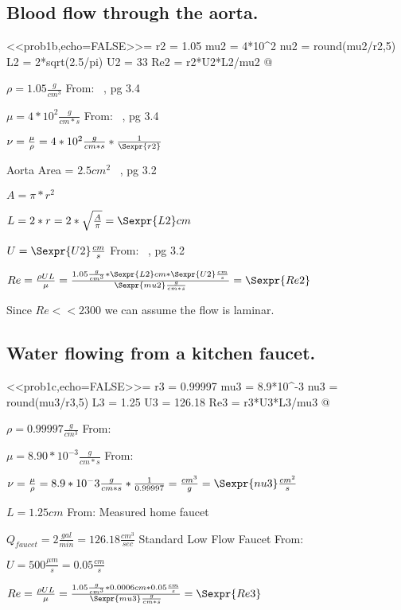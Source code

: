 \documentclass{article}
\begin{document}
\subsection{Blood flow through the aorta.}

<<prob1b,echo=FALSE>>=
r2 = 1.05
mu2 = 4*10^2
nu2 = round(mu2/r2,5)
L2 = 2*sqrt(2.5/pi)
U2 = 33
Re2 = r2*U2*L2/mu2
@

$\rho = 1.05 \frac{g}{cm^{3}}$ From: ~\cite{Kutz2003}, pg 3.4

$\mu = 4*10^{2} \frac{g}{cm*s}$  From: ~\cite{Kutz2003}, pg 3.4

$\nu = \frac{\mu}{\rho} = 4*10^{2} \frac{g}{cm*s} * \frac{1}{\Sexpr{r2}}$

Aorta Area = $2.5cm^{2}$ ~\cite{Kutz2003}, pg 3.2

$A = \pi * r^{2}$ 

$L = 2*r = 2*\sqrt{\frac{A}{\pi}} = \Sexpr{L2} cm$ 

$U = \Sexpr{U2} \frac{cm}{s}$ From: ~\cite{Kutz2003}, pg 3.2

$Re = \frac{\rho UL}{\mu} = \frac{1.05 \frac{g}{cm^{3}}*\Sexpr{L2} cm * \Sexpr{U2}
\frac{cm}{s}}{\Sexpr{mu2} \frac{g}{cm*s}} = \Sexpr{Re2}$

Since $Re << 2300$ we can assume the flow is laminar.

\subsection{Water flowing from a kitchen faucet.}

<<prob1c,echo=FALSE>>=
r3 = 0.99997
mu3 = 8.9*10^-3
nu3 = round(mu3/r3,5)
L3 = 1.25
U3 = 126.18
Re3 = r3*U3*L3/mu3
@

$\rho = 0.99997 \frac{g}{cm^{3}}$ From: ~\cite{WatProp}

$\mu = 8.90*10^{-3} \frac{g}{cm*s}$  From: ~\cite{WatProp} 

$\nu = \frac{\mu}{\rho} = 8.9*10^-3 \frac{g}{cm*s} * \frac{1}{0.99997}
= \frac{cm^{3}}{g} = \Sexpr{nu3} \frac{cm^{2}}{s}$

$L = 1.25 cm$ From: Measured home faucet

$Q_{faucet} = 2 \frac{gal}{min} = 126.18 \frac{cm^{3}}{sec}$  Standard Low Flow Faucet From: ~\cite{WatEff2011}

$U = 500 \frac{\mu m}{s} = 0.05 \frac{cm}{s}$

$Re = \frac{\rho UL}{\mu} = \frac{1.05 \frac{g}{cm^{3}}*0.0006 cm * 0.05
\frac{cm}{s}}{\Sexpr{mu3} \frac{g}{cm*s}} = \Sexpr{Re3}$
\end{document}
